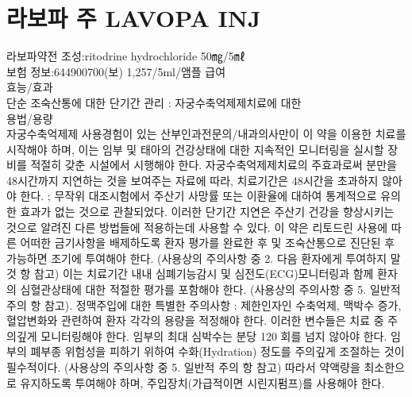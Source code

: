 \section{라보파 주 LAVOPA INJ }%
\begin{Ddoing}{라보파약전}  
조성:ritodrine hydrochloride 50㎎/5㎖\\ 
보험 정보:644900700(보) 1,257/5ml/앰플 급여\\
효능/효과\\
단순 조숙산통에 대한 단기간 관리 : 
자궁수축억제제치료에 대한 \\
  
용법/용량\\
자궁수축억제제 사용경험이 있는 산부인과전문의/내과의사만이 이 약을 이용한 치료를 시작해야 하며, 이는 임부 및 태아의 건강상태에 대한 지속적인 모니터링을 실시할 장비를 적절히 갖춘 시설에서 시행해야 한다. 
자궁수축억제제치료의 주효과로써 분만을 48시간까지 지연하는 것을 보여주는 자료에 따라, 치료기간은 48시간을 초과하지 않아야 한다. ; 무작위 대조시험에서 주산기 사망률 또는 이환율에 대하여 통계적으로 유의한 효과가 없는 것으로 관찰되었다. 이러한 단기간 지연은 주산기 건강을 향상시키는 것으로 알려진 다른 방법들에 적용하는데 사용할 수 있다.
이 약은 리토드린 사용에 따른 어떠한 금기사항을 배제하도록 환자 평가를 완료한 후 및 조숙산통으로 진단된 후 가능하면 조기에 투여해야 한다. (사용상의 주의사항 중 2. 다음 환자에게 투여하지 말 것 항 참고) 이는 치료기간 내내 심폐기능감시 및 심전도(ECG)모니터링과 함께 환자의 심혈관상태에 대한 적절한 평가를 포함해야 한다. (사용상의 주의사항 중 5. 일반적 주의 항 참고). 
정맥주입에 대한 특별한 주의사항 : 제한인자인 수축억제, 맥박수 증가, 혈압변화와 관련하여 환자 각각의 용량을 적정해야 한다. 이러한 변수들은 치료 중 주의깊게 모니터링해야 한다. 임부의 최대 심박수는 분당 120 회를 넘지 않아야 한다. 
임부의 폐부종 위험성을 피하기 위하여 수화(Hydration) 정도를 주의깊게 조절하는 것이 필수적이다. (사용상의 주의사항 중 5. 일반적 주의 항 참고) 따라서 약액량을 최소한으로 유지하도록 투여해야 하며, 주입장치(가급적이면 시린지펌프)를 사용해야 한다. \\
\end{Ddoing}

